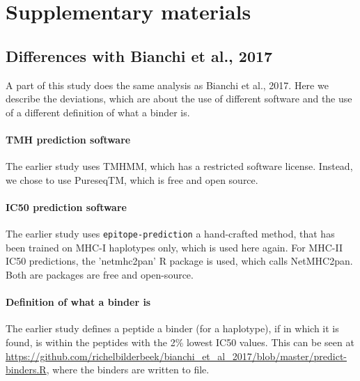 \section{Supplementary materials}

\subsection{Differences with Bianchi et al., 2017}

A part of this study does the same analysis as Bianchi et al., 2017.
Here we describe the deviations, which are about the use of different
software and the use of a different definition of what a binder is.

\paragraph{TMH prediction software}

The earlier study uses TMHMM, which has a restricted software license.
Instead, we chose to use PureseqTM, which is free and open source.



\paragraph{IC50 prediction software}

The earlier study uses \verb;epitope-prediction; a hand-crafted method, 
that has been trained on MHC-I haplotypes only,
which is used here again. For MHC-II IC50 predictions, the
'netmhc2pan' R package is used, which calls NetMHC2pan.
Both are packages are free and open-source.

\paragraph{Definition of what a binder is}

The earlier study defines a peptide a binder (for a haplotype), 
if  in which it is found, 
is within the peptides with the 2\% lowest IC50 values.
This can be seen at \url{https://github.com/richelbilderbeek/bianchi_et_al_2017/blob/master/predict-binders.R},
where the binders are written to file.

